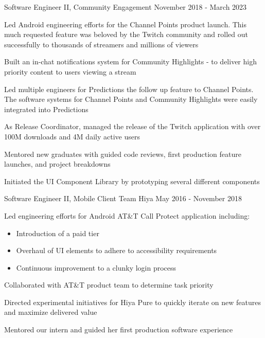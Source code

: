 \begin{cventries}
  \cventry
    {Software Engineer II, Community Engagement} %
    {} %
    {} %
    {November 2018 - March 2023} %
    {
    \begin{cvitems} %
    \item Led Android engineering efforts for the Channel Points product launch. This much requested feature was beloved by the Twitch community and rolled out successfully to thousands of streamers and millions of viewers 
    \item Built an in-chat notifications system for Community Highlights - to deliver high priority content to users viewing a stream
    \item Led multiple engineers for Predictions the follow up feature to Channel Points. The software systems for Channel Points and Community Highlights were easily integrated into Predictions
    \item As Release Coordinator, managed the release of the Twitch application with over 100M downloads and 4M daily active users
    \item Mentored new graduates with guided code reviews, first production feature launches, and project breakdowns
    \item Initiated the UI Component Library by prototyping several different components
    \end{cvitems}
    }

 \cventry
    {Software Engineer II, Mobile Client Team} %
    {Hiya} %
    {} %
    {May 2016 - November 2018} %
    {
    \begin{cvitems} %
    \item { Led engineering efforts for Android AT\&T Call Protect application including:
        \begin{itemize}
            \item Introduction of a paid tier
            \item Overhaul of UI elements to adhere to accessibility requirements
            \item Continuous improvement to a clunky login process
        \end{itemize}}
    \item Collaborated with AT\&T product team to determine task priority
    \item Directed experimental initiatives for Hiya Pure to quickly iterate on new features and maximize delivered value
    \item Mentored our intern and guided her first production software experience
    \end{cvitems}
    }


\end{cventries}
